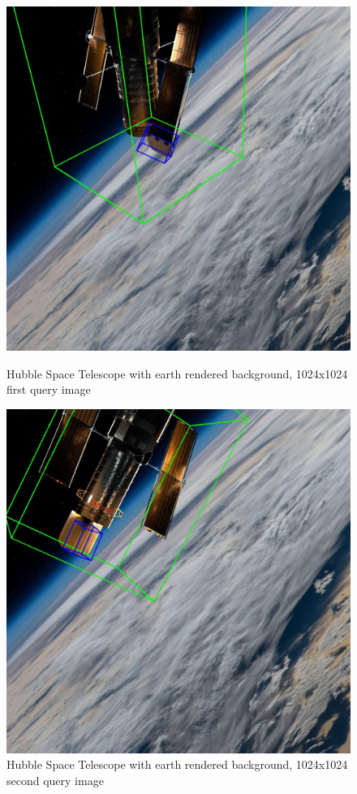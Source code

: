 \begin{figure}[h]
    \centering
    \begin{minipage}{0.45\linewidth}
        \centering
        \includegraphics[width=\linewidth]{data/fig2.jpg} %
        \caption{Hubble Space Telescope with earth rendered background, 1024x1024 first query image}
        \label{fig:fig2}
    \end{minipage}\hfill
    \begin{minipage}{0.45\linewidth}
        \centering
        \includegraphics[width=\linewidth]{data/fig1.jpg} %
        \caption{Hubble Space Telescope with earth rendered background, 1024x1024 second query image}
        \label{fig:fig1}
    \end{minipage}
\end{figure}


